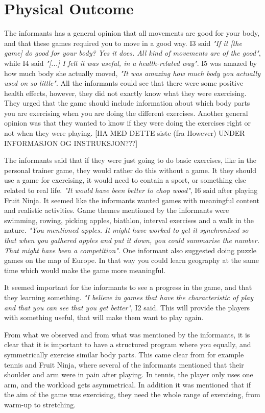\section{Physical Outcome}

The informants has a general opinion that all movements are good for your body, and that these games required you to move in a good way. I3 said \emph{"If it [the game] do good for your body? Yes it does. All kind of movements are of the good"}, while I4 said  \emph{"[...] I felt it was useful, in a health-related way"}. I5 was amazed by how much body she actually moved, \emph{"It was amazing how much body you actually used on so little"}. All the informants could see that there were some positive health effects, however, they did not exactly know what they were exercising. They urged that the game should include information about which body parts you are exercising when you are doing the different exercises. Another general opinion was that they wanted to know if they were doing the exercises right or not when they were playing. [HA MED DETTE siste (fra However) UNDER INFORMASJON OG INSTRUKSJON???]

The informants said that if they were just going to do basic exercises, like in the personal trainer game, they would rather do this without a game. It they should use a game for exercising, it would need to contain a sport, or something else related to real life. \emph{"It would have been better to chop wood"}, I6 said after playing Fruit Ninja. It seemed like the informants wanted games with meaningful content and realistic activities. Game themes mentioned by the informants were swimming, rowing, picking apples, biathlon, interval exercises and a walk in the nature. \emph{"You mentioned apples. It might have worked to get it synchronised so that when you gathered apples and put it down, you could summarise the number. That might have been a competition"}. One informant also suggested doing puzzle games on the map of Europe. In that way you could learn geography at the same time which would make the game more meaningful.

It seemed important for the informants to see a progress in the game, and that they learning something. \emph{"I believe in games that have the characteristic of play and that you can see that you get better"}, I2 said. This will provide the players with something useful, that will make them want to play again.
 
From what we observed and from what was mentioned by the informants, it is clear that it is important to have a structured program where you equally, and symmetrically exercise similar body parts. This came clear from for example tennis and Fruit Ninja, where several of the informants mentioned that their shoulder and arm were in pain after playing. In tennis, the player only uses one arm, and the workload gets asymmetrical. In addition it was mentioned that if the aim of the game was exercising, they need the whole range of exercising, from warm-up to stretching. 
    
